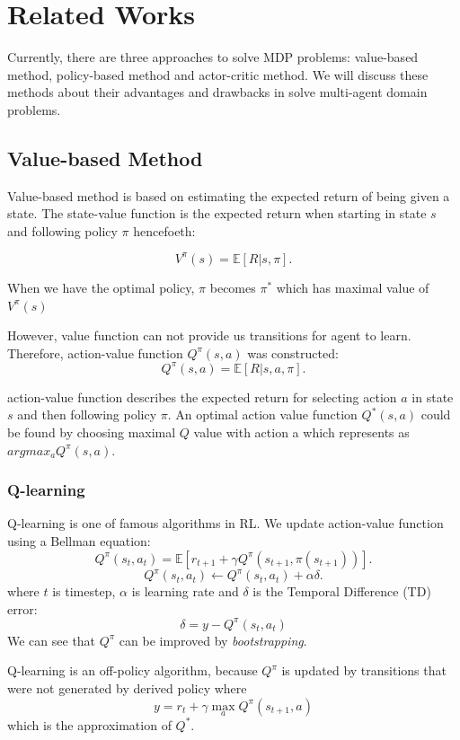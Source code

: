 \documentclass[11pt,twocolumn]{jarticle} %
\begin{document}
\section{Related Works}

Currently, there are three approaches to solve MDP problems: value-based method, policy-based method and actor-critic method. We will discuss these methods about their advantages and drawbacks in solve multi-agent domain problems.

\subsection{Value-based Method}

Value-based method is based on estimating the expected return of being given a state. The state-value function is the expected return when starting in state $s$ and following policy $\pi$ hencefoeth: 

\begin{equation}
V^\pi(s) = \mathbb{E}[R|s, \pi].
\end{equation}

When we have the optimal policy, $\pi$ becomes $\pi^*$ which has maximal value of $V^\pi(s)$\par
However, value function can not provide us transitions for agent to learn. Therefore, action-value function $Q^\pi(s, a)$ was constructed:
\begin{equation}
Q^\pi(s, a) = \mathbb{E}[R|s, a, \pi]. 
\end{equation}

action-value function describes the expected return for selecting action $a$ in state $s$ and then following policy $\pi$. An optimal action value function $Q^*(s, a)$ could be found by choosing maximal $Q$ value with action a which represents as $argmax_a Q^\pi(s, a)$. 

\subsubsection{Q-learning\cite{qlearning}}

Q-learning is one of famous algorithms in RL. We update action-value function using a Bellman equation: 
\begin{equation}
Q^\pi(s_t, a_t) = \mathbb{E}[r_{t+1} + \gamma Q^\pi(s_{t+1}, \pi(s_{t+1}))].  
\end{equation}
\begin{equation}
Q^\pi(s_t, a_t) \leftarrow Q^\pi(s_t, a_t) + \alpha\delta.  
\end{equation}
where $t$ is timestep, $\alpha$ is learning rate and $\delta$ is the Temporal Difference (TD) error:
\begin{equation}
\delta = y - Q^\pi(s_t, a_t)
\end{equation}
We can see that $Q^\pi$ can be improved by \textsl{bootstrapping}.\par 
Q-learning is an off-policy algorithm, because $Q^\pi$ is updated by transitions that were not generated by derived policy where 
\begin{equation}
y = r_t + \gamma\max_a Q^\pi(s_{t+1}, a)
\end{equation}
which is the approximation of $Q^*$.
\end{document}
